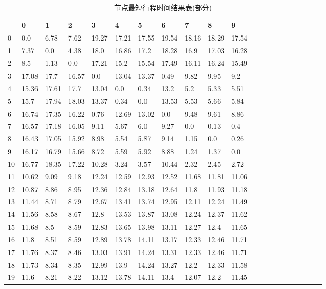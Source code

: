 \begin{table}[H]
    \caption{节点最短行程时间结果表(部分)}\label{tab:table2}
    \begin{tabular}{lllllllllllllllllllll}
        \hline
        & 0     & 1     & 2     & 3     & 4     & 5     & 6     & 7     & 8     & 9     \\
        \hline
        0  & 0.0   & 6.78  & 7.62  & 19.27 & 17.21 & 17.55 & 19.54 & 18.16 & 18.29 & 17.54 \\
        1  & 7.37  & 0.0   & 4.38  & 18.0  & 16.86 & 17.2  & 18.28 & 16.9  & 17.03 & 16.28 \\
        2  & 8.5   & 1.13  & 0.0   & 17.21 & 15.2  & 15.54 & 17.49 & 16.11 & 16.24 & 15.49 \\
        3  & 17.08 & 17.7  & 16.57 & 0.0   & 13.04 & 13.37 & 0.49  & 9.82  & 9.95  & 9.2   \\
        4  & 15.36 & 17.61 & 17.7  & 13.04 & 0.0   & 0.34  & 13.2  & 5.2   & 5.33  & 5.51  \\
        5  & 15.7  & 17.94 & 18.03 & 13.37 & 0.34  & 0.0   & 13.53 & 5.53  & 5.66  & 5.84  \\
        6  & 16.74 & 17.35 & 16.22 & 0.76  & 12.69 & 13.02 & 0.0   & 9.48  & 9.61  & 8.86  \\
        7  & 16.57 & 17.18 & 16.05 & 9.11  & 5.67  & 6.0   & 9.27  & 0.0   & 0.13  & 0.4   \\
        8  & 16.43 & 17.05 & 15.92 & 8.98  & 5.54  & 5.87  & 9.14  & 1.15  & 0.0   & 0.26  \\
        9  & 16.17 & 16.79 & 15.66 & 8.72  & 5.59  & 5.92  & 8.88  & 1.24  & 1.37  & 0.0   \\
        10 & 16.77 & 18.35 & 17.22 & 10.28 & 3.24  & 3.57  & 10.44 & 2.32  & 2.45  & 2.72  \\
        11 & 10.62 & 9.09  & 9.18  & 12.24 & 12.59 & 12.93 & 12.52 & 11.68 & 11.81 & 11.06 \\
        12 & 10.87 & 8.86  & 8.95  & 12.36 & 12.84 & 13.18 & 12.64 & 11.8  & 11.93 & 11.18 \\
        13 & 11.44 & 8.71  & 8.79  & 12.67 & 13.41 & 13.74 & 12.95 & 12.11 & 12.24 & 11.49 \\
        14 & 11.56 & 8.58  & 8.67  & 12.8  & 13.53 & 13.87 & 13.08 & 12.24 & 12.37 & 11.62 \\
        15 & 11.68 & 8.5   & 8.59  & 12.83 & 13.65 & 13.98 & 13.11 & 12.27 & 12.4  & 11.65 \\
        16 & 11.8  & 8.51  & 8.59  & 12.89 & 13.78 & 14.11 & 13.17 & 12.33 & 12.46 & 11.71 \\
        17 & 11.76 & 8.37  & 8.46  & 13.03 & 13.91 & 14.24 & 13.31 & 12.33 & 12.46 & 11.71 \\
        18 & 11.73 & 8.34  & 8.35  & 12.99 & 13.9  & 14.24 & 13.27 & 12.2  & 12.33 & 11.58 \\
        19 & 11.6  & 8.21  & 8.22  & 13.12 & 13.78 & 14.11 & 13.4  & 12.07 & 12.2  & 11.45 \\
        \hline
    \end{tabular}
\end{table}






